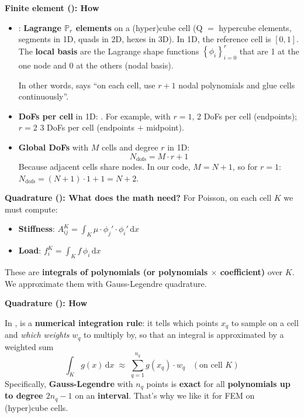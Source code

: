 \begin{enumerate}
    \textcolor{Green3}{ \textbf{Finite element (): How }}
    \begin{itemize}
        \item {}: \textbf{Lagrange $\mathbb{P}_{r}$ elements} on a (hyper)cube cell (Q $=$ hypercube elements, segments in 1D, quads in 2D, hexes in 3D). In 1D, the reference cell is $\left[0,1\right]$. The \textbf{local basis} are the Lagrange shape functions $\left\{\phi_{i}\right\}_{i=0}^{r}$ that are 1 at the one node and 0 at the others (nodal basis).
        
        In other words,  says ``on each cell, use $r+1$ nodal polynomials and glue cells continuously''.
        \item \textbf{DoFs per cell} in 1D: . For example, with $r=1$, 2 DoFs per cell (endpoints); $r=2$ 3 DoFs per cell (endpoints $+$ midpoint).
        \item \textbf{Global DoFs} with $M$ cells and degree $r$ in 1D:
        \begin{equation*}
            N_{\text{dofs}} = M \cdot r + 1
        \end{equation*}
        Because adjacent cells share nodes. In our code, $M = N+1$, so for $r=1$: $N_{\text{dofs}} = \left(N+1\right) \cdot 1 + 1 = N + 2$.
    \end{itemize}

    \textcolor{Green3}{ \textbf{Quadrature (): What does the math need?}} For Poisson, on each cell $K$ we must compute:
    \begin{itemize}
        \item \textbf{Stiffness}: $A_{ij}^K = \displaystyle\int_K \mu \cdot \phi_{j}' \cdot \phi_{i}' \,\mathrm{d}x$
        \item \textbf{Load}: $f_{i}^{K} = \displaystyle\int_{K} f \, \phi_{i} \, \mathrm{d}x$
    \end{itemize}
    These are \textbf{integrals of polynomials (or polynomials $\times$ coefficient)} over $K$. We approximate them with Gauss-Legendre quadrature.

    \textcolor{Green3}{ \textbf{Quadrature (): How }}
    
    In ,  is a \textbf{numerical integration rule}: it tells  which points $x_{q}$ to sample on a cell and \emph{which weights} $w_{q}$ to multiply by, so that an integral is approximated by a weighted sum
    \begin{equation*}
        \displaystyle\int_{K} g(x)\,\mathrm{d}x \;\approx\; \displaystyle\sum_{q=1}^{n_q} g(x_q)\cdot w_q \;\;\;(\text{on cell }K)
    \end{equation*}
    Specifically, \textbf{Gauss-Legendre} with $n_{q}$ points is \textbf{exact} for all \textbf{polynomials up to degree $2n_{q}-1$} on an \textbf{interval}. That's why we like it for FEM on (hyper)cube cells.
    

\end{enumerate}
